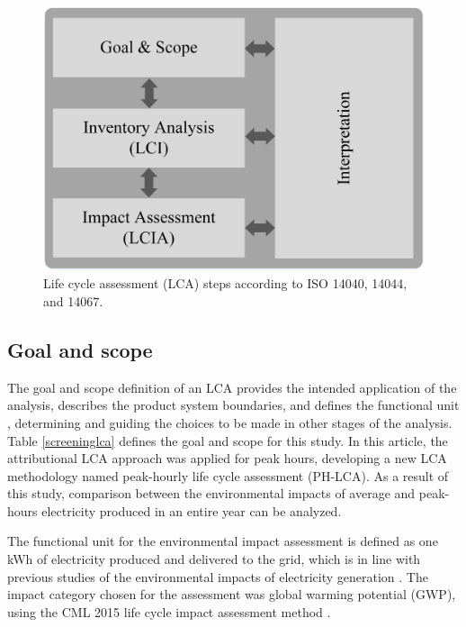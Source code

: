 {\begin{figure}[htbp]
	\centering
	\includegraphics[width=0.6\columnwidth ]{ChapterLCA/Images/LCA_Framework_v3.jpg}
		\caption{Life cycle assessment (LCA) steps according to ISO 14040, 14044, and 14067.}
	\label{LCA_Methodology}  %
\end{figure}


\subsection{Goal and scope} \label{goalscope}
{The goal and scope definition of an LCA provides the intended application of the analysis, describes the product system boundaries, and defines the functional unit \cite{REBITZER2004701}, determining and guiding the choices to be made in other stages of the analysis. Table \ref{screeninglca} defines the goal and scope for this study.} {In this article, the attributional LCA approach was applied for peak hours, developing a new LCA methodology named peak-hourly life cycle assessment (PH-LCA). As a result of this study, comparison between the environmental impacts of average and peak-hours  electricity produced in an entire year can be analyzed.} 

{The functional unit for the environmental impact assessment is defined as one kWh of electricity produced and delivered to the grid, which is in line with previous studies of the environmental impacts of electricity generation \cite{Nilsson2017AssessingEmissions, Khan2018, Khan2018AnalysisIntensity, MESSAGIE2014469, Cubi2015IncorporationAssessment, Buyle2019}. The impact category chosen for the assessment was global warming potential (GWP), using the CML 2015 life cycle impact assessment method \cite{Guinee2001}.} 

}
